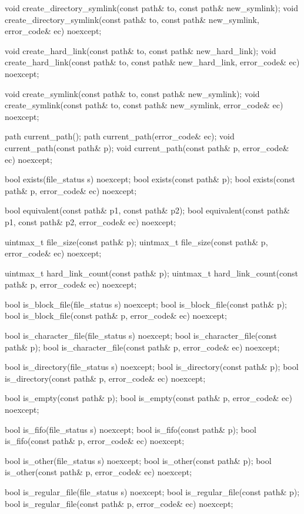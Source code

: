 \begin{codeblock}
{  void create_directory_symlink(const path& to, const path& new_symlink);
  void create_directory_symlink(const path& to, const path& new_symlink,
                                error_code& ec) noexcept;

  void create_hard_link(const path& to, const path& new_hard_link);
  void create_hard_link(const path& to, const path& new_hard_link,
                        error_code& ec) noexcept;

  void create_symlink(const path& to, const path& new_symlink);
  void create_symlink(const path& to, const path& new_symlink,
                      error_code& ec) noexcept;

  path current_path();
  path current_path(error_code& ec);
  void current_path(const path& p);
  void current_path(const path& p, error_code& ec) noexcept;

  bool exists(file_status s) noexcept;
  bool exists(const path& p);
  bool exists(const path& p, error_code& ec) noexcept;

  bool equivalent(const path& p1, const path& p2);
  bool equivalent(const path& p1, const path& p2, error_code& ec) noexcept;

  uintmax_t file_size(const path& p);
  uintmax_t file_size(const path& p, error_code& ec) noexcept;

  uintmax_t hard_link_count(const path& p);
  uintmax_t hard_link_count(const path& p, error_code& ec) noexcept;

  bool is_block_file(file_status s) noexcept;
  bool is_block_file(const path& p);
  bool is_block_file(const path& p, error_code& ec) noexcept;

  bool is_character_file(file_status s) noexcept;
  bool is_character_file(const path& p);
  bool is_character_file(const path& p, error_code& ec) noexcept;

  bool is_directory(file_status s) noexcept;
  bool is_directory(const path& p);
  bool is_directory(const path& p, error_code& ec) noexcept;

  bool is_empty(const path& p);
  bool is_empty(const path& p, error_code& ec) noexcept;

  bool is_fifo(file_status s) noexcept;
  bool is_fifo(const path& p);
  bool is_fifo(const path& p, error_code& ec) noexcept;

  bool is_other(file_status s) noexcept;
  bool is_other(const path& p);
  bool is_other(const path& p, error_code& ec) noexcept;

  bool is_regular_file(file_status s) noexcept;
  bool is_regular_file(const path& p);
  bool is_regular_file(const path& p, error_code& ec) noexcept;

}
\end{codeblock}
